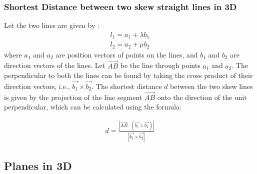 \begin{frame}
    \frametitle{Shortest Distance between two skew straight lines in 3D}

    Let the two lines are given by :
    \begin{align*}
    l_{1} = a_{1} + \lambda b_{1} \\
    l_{2} = a_{2} + \mu b_{2}   
    \end{align*}
    where \(a_{1}\) and \(a_{2}\) are position vectors of points on the lines, and \(b_{1}\) and \(b_{2}\) are direction vectors of the lines. Let \(\vec{AB}\) be the line through points \(a_{1}\) and \(a_{2}\). The perpendicular to both the lines can be found by taking the cross product of their direction vectors, i.e., \(\vec{b_{1}} \times \vec{b_{2}}\). The shortest distance \(d\) between the two skew lines is given by the projection of the line segment \(\vec{AB}\) onto the direction of the unit perpendicular, which can be calculated using the formula:

    \begin{align*}
    d = \frac{|\vec{AB} \cdot (\vec{b_{1}} \times \vec{b_{2}})|}{|\vec{b_{1}} \times \vec{b_{2}}|}
    \end{align*}

\end{frame}



\subsection{Planes in 3D}

